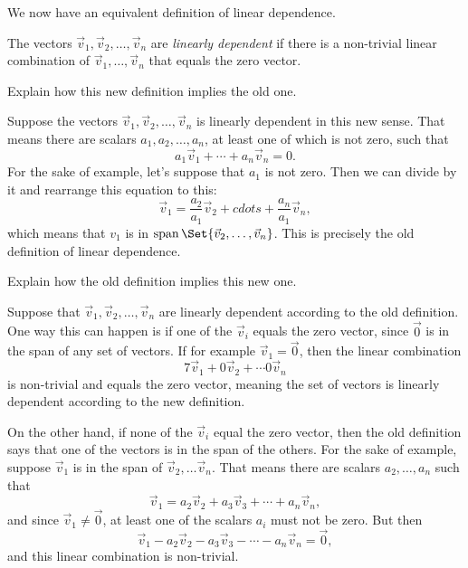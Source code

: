 \documentclass{problemset}
\DeclareMathOperator{\Span}{span}
\begin{document}
	We now have an equivalent definition of linear dependence.

	\begin{definition}
	The vectors $\vec v_1,\vec v_2,\ldots,\vec v_n$ are
	\emph{linearly dependent} if there is a non-trivial
	linear combination of $\vec v_1,\ldots,\vec v_n$ that
	equals the zero vector.
	\end{definition}

	\question
	\begin{parts}
		\item Explain how this new definition implies the old one.
			\begin{solution}
				Suppose the vectors $\vec v_1, \vec v_2, \dots, \vec v_n$ is 
				linearly dependent in this new sense. That means there are 
				scalars	$a_1, a_2, \dots, a_n$, at least one of which is not 
				zero, such that
				\[
					a_1 \vec v_1 + \cdots + a_n \vec v_n = 0.
				\]
				For the sake of example, let's suppose that $a_1$ is not zero. 
				Then we can divide by it and rearrange this equation to this:
				\[
					\vec v_1=\frac{a_2}{a_1}\vec v_2 +cdots+\frac{a_n}{a_1}\vec v_n,
				\]
				which means that $v_1$ is in $\Span\Set{\vec v_2, \dots, \vec v_n}$. 
				This is precisely the old definition of linear dependence.
			\end{solution}
		\item Explain how the old definition implies this new one.
			\begin{solution}
				Suppose that $\vec v_1, \vec v_2, \dots, \vec v_n$ are linearly 
				dependent according to the old definition. One way this can 
				happen is if one of the	$\vec v_i$ equals the zero vector, 
				since $\vec 0$ is in the span of any set of vectors. If for 
				example $\vec v_1 = \vec 0$, then the linear combination
				\[
					7 \vec v_1 + 0 \vec v_2 + \cdots 0 \vec v_n
				\]
				is non-trivial and equals the zero vector, meaning the set of 
				vectors is	linearly dependent according to the new definition.

				On the other hand, if none of the $\vec v_i$ equal the zero 
				vector, then the old definition says that one of the vectors is 
				in the span of the others. For the sake of example, suppose 
				$\vec v_1$ is in the span of $\vec v_2, \dots \vec v_n$. That 
				means there are scalars $a_2, \dots, a_n$ such that 
				\[
					\vec v_1 = a_2 \vec v_2 + a_3 \vec v_3 + \cdots + a_n \vec v_n,
				\]
				and since $\vec v_1 \neq \vec 0$, at least one of the scalars 
				$a_i$ must not be zero. But then
				\[
					\vec v_1-a_2 \vec v_2-a_3 \vec v_3-\cdots-a_n \vec v_n=\vec 0,
				\]
				and this linear combination is non-trivial. 
			\end{solution}
	\end{parts}
\end{document}
